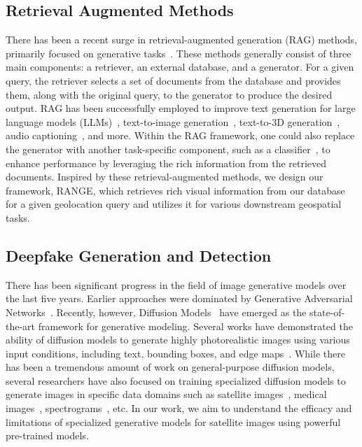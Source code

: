 \subsection{Retrieval Augmented Methods}
There has been a recent surge in retrieval-augmented generation (RAG) methods, primarily focused on generative tasks~\cite{chenre, blattmann2022retrieval, kirstain2023x, lewis2020retrieval, borgeaud2022improving, siriwardhana2023improving, seoretrieval, koizumi2020audio, wangretrieval}. These methods generally consist of three main components: a retriever, an external database, and a generator. For a given query, the retriever selects a set of documents from the database and provides them, along with the original query, to the generator to produce the desired output. RAG has been successfully employed to improve text generation for large language models (LLMs)~\cite{lewis2020retrieval, borgeaud2022improving, siriwardhana2023improving}, text-to-image generation~\cite{chenre, blattmann2022retrieval, kirstain2023x}, text-to-3D generation~\cite{seoretrieval}, audio captioning~\cite{koizumi2020audio}, and more. Within the RAG framework, one could also replace the generator with another task-specific component, such as a classifier~\cite{long2022retrieval}, to enhance performance by leveraging the rich information from the retrieved documents. Inspired by these retrieval-augmented methods, we design our framework, RANGE, which retrieves rich visual information from our database for a given geolocation query and utilizes it for various downstream geospatial tasks.

\subsection{Deepfake Generation and Detection}
There has been significant progress in the field of image generative models over the last five years. Earlier approaches were dominated by Generative Adversarial Networks~\cite{goodfellow2020generative}. Recently, however, Diffusion Models~\cite{ho2020denoising} have emerged as the state-of-the-art framework for generative modeling. Several works have demonstrated the ability of diffusion models to generate highly photorealistic images using various input conditions, including text, bounding boxes, and edge maps~\cite{rombach2022high, saharia2022photorealistic, peebles2023scalable,zhang2023adding}. While there has been a tremendous amount of work on general-purpose diffusion models, several researchers have also focused on training specialized diffusion models to generate images in specific data domains such as satellite images~\cite{khanna2023diffusionsat, sastry2024geosynth, tang2024crs}, medical images~\cite{khader2023denoising, yoon2023sadm}, spectrograms~\cite{majumder2024tango, ghosal2023text}, etc. In our work, we aim to understand the efficacy and limitations of specialized generative models for satellite images using powerful pre-trained models.    

